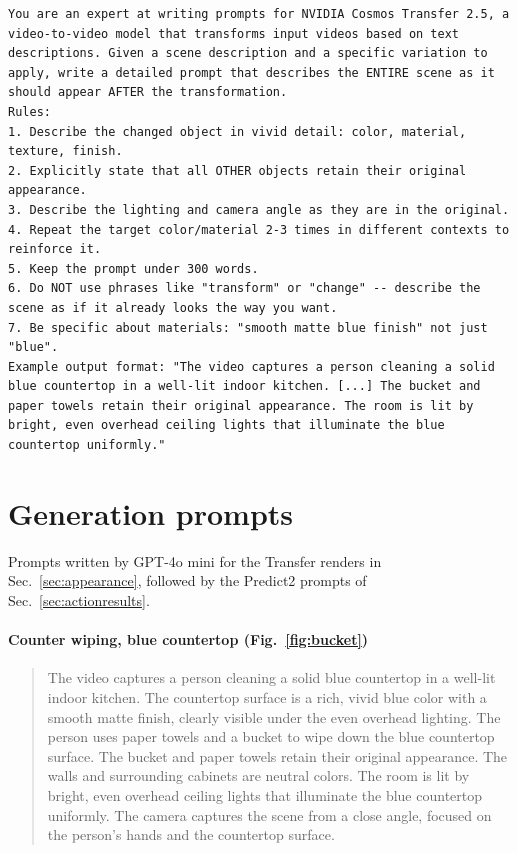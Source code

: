 \begin{lstlisting}
You are an expert at writing prompts for NVIDIA Cosmos Transfer 2.5, a video-to-video model that transforms input videos based on text descriptions. Given a scene description and a specific variation to apply, write a detailed prompt that describes the ENTIRE scene as it should appear AFTER the transformation.
Rules:
1. Describe the changed object in vivid detail: color, material, texture, finish.
2. Explicitly state that all OTHER objects retain their original appearance.
3. Describe the lighting and camera angle as they are in the original.
4. Repeat the target color/material 2-3 times in different contexts to reinforce it.
5. Keep the prompt under 300 words.
6. Do NOT use phrases like "transform" or "change" -- describe the scene as if it already looks the way you want.
7. Be specific about materials: "smooth matte blue finish" not just "blue".
Example output format: "The video captures a person cleaning a solid blue countertop in a well-lit indoor kitchen. [...] The bucket and paper towels retain their original appearance. The room is lit by bright, even overhead ceiling lights that illuminate the blue countertop uniformly."
\end{lstlisting}

\section{Generation prompts}
\label{app:prompts}
Prompts written by GPT-4o mini for the Transfer renders in Sec.~\ref{sec:appearance}, followed by the Predict2 prompts of Sec.~\ref{sec:actionresults}.

\paragraph{Counter wiping, blue countertop (Fig.~\ref{fig:bucket})}
\begin{quote}\small
The video captures a person cleaning a solid blue countertop in a well-lit indoor kitchen. The countertop surface is a rich, vivid blue color with a smooth matte finish, clearly visible under the even overhead lighting. The person uses paper towels and a bucket to wipe down the blue countertop surface. The bucket and paper towels retain their original appearance. The walls and surrounding cabinets are neutral colors. The room is lit by bright, even overhead ceiling lights that illuminate the blue countertop uniformly. The camera captures the scene from a close angle, focused on the person's hands and the countertop surface.
\end{quote}

